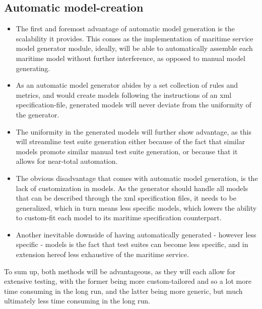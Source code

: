 \subsection{Automatic model-creation}
\begin{itemize}
	\item The first and foremost advantage of automatic model generation is the scalability it provides. This comes as the implementation of  maritime service model generator module, ideally, will be able to automatically assemble each maritime model without further interference, as opposed to manual model generating.
	\item As an automatic model generator abides by a set collection of rules and metrics, and would create models following the instructions of an xml specification-file, generated models will never deviate from the uniformity of the generator.
	\item The uniformity in the generated models will further show advantage, as this will streamline test suite generation either because of the fact that similar models promote similar manual test suite generation, or because that it allows for near-total automation.
\end{itemize}
\begin{itemize}
	\item The obvious disadvantage that comes with automatic model generation, is the lack of customization in models. As the generator should handle all models that can be described through the xml specification files, it needs to be generalized, which in turn means less specific models, which lowers the ability to custom-fit each model to its maritime specification counterpart.
	\item Another inevitable downside of having automatically generated - however less specific - models is the fact that test suites can become less specific, and in extension hereof less exhaustive of the maritime service.
\end{itemize}

To sum up, both methods will be advantageous, as they will each allow for extensive testing, with the former being more custom-tailored and so a lot more time consuming in the long run, and the latter being more generic, but much ultimately less time consuming in the long run.